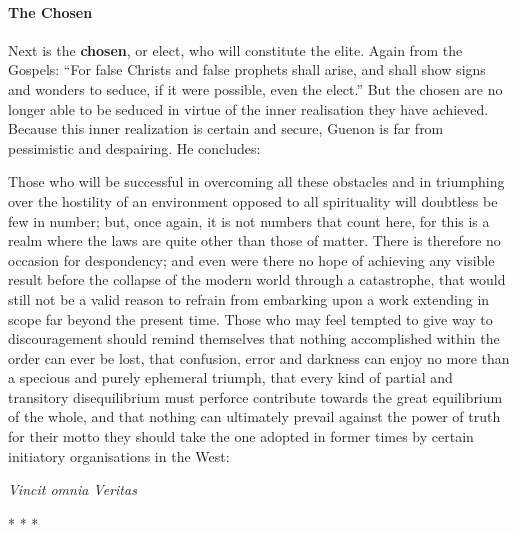 \paragraph{The Chosen}


Next is the \textbf{chosen}, or elect, who will constitute the elite. Again from the Gospels: ``For false Christs and false prophets shall arise, and shall show signs and wonders to seduce, if it were possible, even the elect.'' But the chosen are no longer able to be seduced in virtue of the inner realisation they have achieved. Because this inner realization is certain and secure, Guenon is far from pessimistic and despairing. He concludes:

\begin{quotex}
Those who will be successful in overcoming all these obstacles and in triumphing over the hostility of an environment opposed to all spirituality will doubtless be few in number; but, once again, it is not numbers that count here, for this is a realm where the laws are quite other than those of matter. There is therefore no occasion for despondency; and even were there no hope of achieving any visible result before the collapse of the modern world through a catastrophe, that would still not be a valid reason to refrain from embarking upon a work extending in scope far beyond the present time. Those who may feel tempted to give way to discouragement should remind themselves that nothing accomplished within the order can ever be lost, that confusion, error and darkness can enjoy no more than a specious and purely ephemeral triumph, that every kind of partial and transitory disequilibrium must perforce contribute towards the great equilibrium of the whole, and that nothing can ultimately prevail against the power of truth for their motto they should take the one adopted in former times by certain initiatory organisations in the West:
\end{quotex}


\textit{Vincit omnia Veritas}



\begin{center}* * *\end{center}

